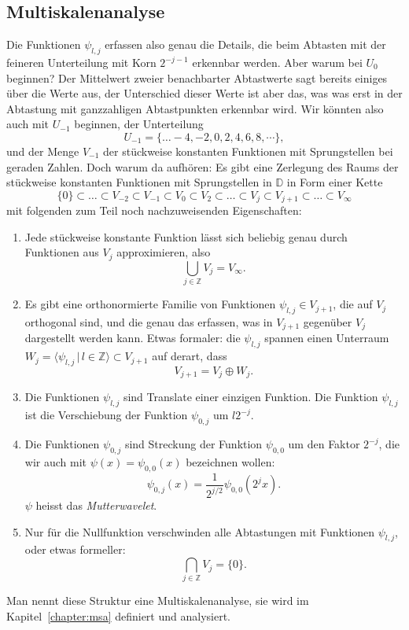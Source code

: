 \subsection{Multiskalenanalyse}
Die Funktionen $\psi_{l,j}$ erfassen also genau die Details, die beim
Abtasten mit der feineren Unterteilung mit Korn $2^{-j-1}$ erkennbar
werden.
Aber warum bei $U_0$ beginnen?
Der Mittelwert zweier benachbarter Abtastwerte sagt bereits einiges
über die Werte aus, der Unterschied dieser Werte ist aber das, was
was erst in der Abtastung mit ganzzahligen Abtastpunkten erkennbar wird.
Wir könnten also auch mit $U_{-1}$ beginnen, der Unterteilung
\[
U_{-1} = \{\dots -4,-2,0,2,4,6,8,\cdots\},
\]
und der Menge $V_{-1}$ der stückweise konstanten Funktionen mit
Sprungstellen bei geraden Zahlen.
Doch warum da aufhören: Es gibt eine Zerlegung des Raums der stückweise
konstanten Funktionen mit Sprungstellen in $\mathbb D$ in Form einer
Kette
\begin{equation}
\{0\}
\subset
\dots
\subset
V_{-2}\subset V_{-1} \subset V_{0} \subset V_{2} \subset\dots\subset
V_j \subset V_{j+1}\subset\dots \subset V_{\infty}
\label{haar:kette}
\end{equation}
mit folgenden zum Teil noch nachzuweisenden Eigenschaften:
\begin{enumerate}
\item
Jede stückweise konstante Funktion lässt sich beliebig genau
durch Funktionen aus $V_j$ approximieren, also
\[
\bigcup_{j\in\mathbb Z} V_j = V_\infty.
\]
\item
Es gibt eine orthonormierte Familie von Funktionen $\psi_{l,j}\in V_{j+1}$,
die auf $V_j$ orthogonal sind, und die genau das erfassen, was in $V_{j+1}$
gegenüber $V_j$ dargestellt werden kann.
Etwas formaler: die $\psi_{l,j}$ spannen einen Unterraum
$W_{j} = \langle \psi_{l,j}\,|\, l\in\mathbb Z\rangle \subset V_{j+1}$
auf derart, dass
\[
V_{j+1} = V_j \oplus W_j.
\]
\item 
Die Funktionen $\psi_{l,j}$ sind Translate einer einzigen Funktion.
Die Funktion $\psi_{l,j}$ ist die Verschiebung der Funktion $\psi_{0,j}$ 
um $l2^{-j}$.
\item
Die Funktionen $\psi_{0,j}$ sind Streckung der Funktion
$\psi_{0,0}$ um den Faktor $2^{-j}$, die wir auch mit
$\psi(x)=\psi_{0,0}(x)$ bezeichnen wollen:
\[
\psi_{0,j}(x) = \frac1{2^{j/2}}\psi_{0,0}(2^jx).
\]
$\psi$ heisst das {\em Mutterwavelet}.
\item 
Nur für die Nullfunktion verschwinden alle Abtastungen mit Funktionen
$\psi_{l,j}$, oder etwas formeller:
\[
\bigcap_{j\in\mathbb Z} V_j
=
\{0\}.
\]
\end{enumerate}
Man nennt diese Struktur eine Multiskalenanalyse, sie wird im
Kapitel~\ref{chapter:msa} definiert und analysiert.

